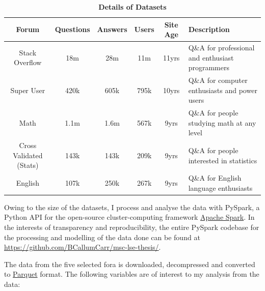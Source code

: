 \documentclass[11pt,preprint, authoryear]{article}
\numberwithin{equation}{section}
\begin{document}
\begin{longtable} {@{} cccccp{7cm} @{}}
\caption{\textbf{Details of Datasets}}
\label{tab:fora}\\ 
\toprule
Forum & Questions & Answers & Users & Site Age & Description \\ 
\midrule
Stack Overflow & 18m & 28m & 11m & 11yrs & Q\&A for professional and enthusiast programmers \\
Super User & 420k & 605k & 795k & 10yrs & Q\&A for computer enthusiasts and power users \\ 
Math & 1.1m & 1.6m & 567k & 9yrs & Q\&A for people studying math at any level \\
Cross Validated (Stats) & 143k & 143k & 209k & 9yrs & Q\&A for people interested in statistics \\ 
English & 107k & 250k & 267k & 9yrs & Q\&A for English language enthusiasts \\ 

\bottomrule
\end{longtable}

\normalsize

Owing to the size of the datasets, I process and analyse the data with
PySpark, a Python API for the open-source cluster-computing framework
\href{http://spark.apache.org}{Apache Spark}. In the interests of
transparency and reproducibility, the entire PySpark codebase for the
processing and modelling of the data done can be found at
\url{https://github.com/BCallumCarr/msc-lse-thesis/}.

The data from the five selected fora is downloaded, decompressed and
converted to \href{https://parquet.apache.org}{Parquet} format. The
following variables are of interest to my analysis from the data:

\end{document}
